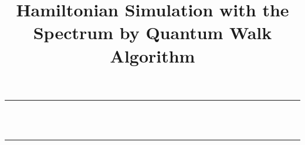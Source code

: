 
\newcommand\email[1]{
    \href{mailto:#1}{\url{#1}}
}

\newcommand\authorblock[3]{
    #1\\
    \small{#2}\\
    \small{\email{#3}}
}

\newcommand\keywords[1]{
    \vspace{5mm}\noindent
    \small{\textbf{\textit{Keywords ---}} #1}
}

\title{Hamiltonian Simulation with the Spectrum by Quantum Walk Algorithm}



\begin{titlepage}
    \newcommand{\HRule}{\rule{\linewidth}{0.5mm}}

	\center

	\HRule\\[0.4cm]

	{\huge\bfseries \thetitle\\[0.4cm]}

	\HRule\\[1.5cm]


\end{titlepage}
